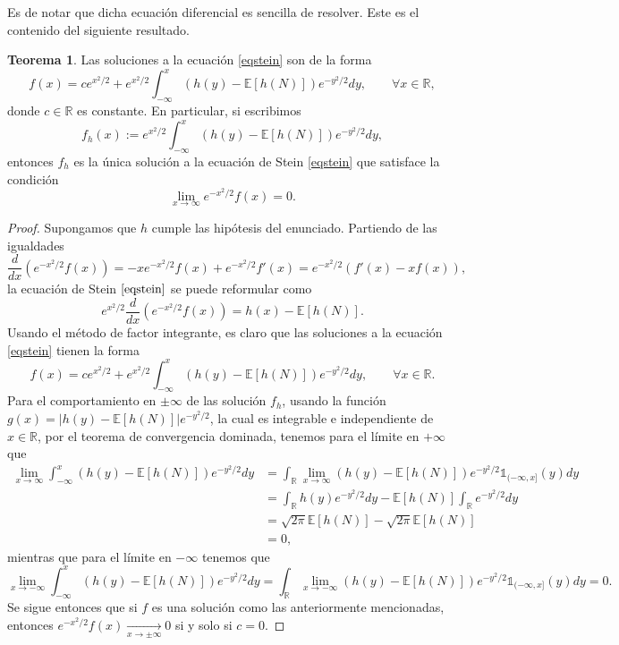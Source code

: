 \documentclass[letterpaper,twoside,12pt]{book}
\newcommand{\R}{\mathbb{R}}
\newcommand{\E}{\mathbb{E}}
\newcommand{\1}{\mathds{1}}
\newcommand{\abs}[1]{\left\lvert #1 \right\rvert}
\renewcommand{\to}{\rightarrow}
\theoremstyle{definition}
\theoremstyle{definition}
\newtheorem{teo}{Teorema}
\theoremstyle{remark}
\theoremstyle{definition}
\theoremstyle{definition}
\theoremstyle{definition}
\theoremstyle{definition}
\theoremstyle{definition}
\begin{document}
 Es de notar que dicha ecuación diferencial es sencilla de resolver. Este es el contenido del siguiente resultado.

 \begin{teo}\label{soleqstein}
  Las soluciones a la ecuación \eqref{eqstein} son de la forma 
  \[
  f(x)=ce^{x^2/2}+e^{x^2/2}\int_{-\infty}^x(h(y)-\E\left[h(N)\right])e^{-y^2/2}dy, \qquad \forall x\in \R,
  \] 
  donde $c\in \R$ es constante. En particular, si escribimos 
  \[
   f_h(x):=e^{x^2/2}\int_{-\infty}^x(h(y)-\E\left[h(N)\right])e^{-y^2/2}dy,
  \]
  entonces $f_h$ es la única solución a la ecuación de Stein \eqref{eqstein} que satisface la condición 
  \[
  \lim_{x\to \infty}e^{-x^2/2}f(x)=0.
  \]
  \end{teo}
  \begin{proof} 
    Supongamos que $h$ cumple las hipótesis del enunciado. Partiendo de las igualdades 
    \[
    \frac{d}{dx}\left(e^{-x^2/2}f(x)\right)=-xe^{-x^2/2}f(x)+e^{-x^2/2}f'(x)=e^{-x^2/2}(f'(x)-xf(x)),
    \]
    la ecuación de Stein $\eqref{eqstein}$ se puede reformular como 
    \[
      e^{x^2/2}\frac{d}{dx}\left(e^{-x^2/2}f(x)\right)=h(x)-\E\left[h(N)\right].
    \] 
    Usando el método de factor integrante, es claro que las soluciones a la ecuación  \eqref{eqstein} tienen la forma 
    \begin{equation*}
      f(x)=ce^{x^2/2}+e^{x^2/2}\int_{-\infty}^{x}(h(y)-\E\left[h(N)\right])e^{-y^2/2}dy, \qquad \forall x\in \R.
    \end{equation*}
   Para el comportamiento en $\pm\infty$ de las solución $f_h$, usando la función $g(x)=\abs{h(y)-\E\left[h(N)\right]}e^{-y^2/2}$, la cual es integrable e independiente de $x\in \R$, por el teorema de convergencia dominada, tenemos para el límite en $+\infty$ que
   \begin{align*}
      \lim_{x\to \infty}\int_{-\infty}^x \left(h(y)-\E\left[h(N)\right]\right)e^{-y^2/2}dy&=\int_\R\lim_{x\to\infty}\left(h(y)-\E\left[h(N)\right]\right)e^{-y^2/2}\1_{(-\infty,x]}(y)dy\\
      &=\int_\R h(y)e^{-y^2/2}dy-\E\left[h(N)\right]\int_\R e^{-y^2/2}dy\\
      &=\sqrt{2\pi}\E\left[h(N)\right]-\sqrt{2\pi}\E\left[h(N)\right]\\
      &=0,
      \end{align*}
      mientras que para el límite en $-\infty$ tenemos que 
      \[
         \lim_{x\to -\infty}\int_{-\infty}^x \left(h(y)-\E\left[h(N)\right]\right)e^{-y^2/2}dy=\int_\R\lim_{x\to-\infty}\left(h(y)-\E\left[h(N)\right]\right)e^{-y^2/2}\1_{(-\infty,x]}(y)dy=0.
      \]
      Se sigue entonces que si $f$ es una solución como las anteriormente mencionadas, entonces $e^{-x^2/2}f(x)\xrightarrow[x\to\pm\infty]{}0$ si y solo si $c=0$.
   \end{proof}
\end{document}
